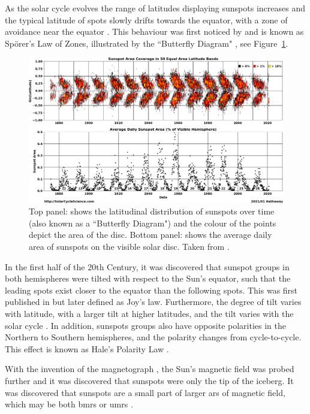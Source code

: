 As the solar cycle evolves the range of latitudes displaying sunspots increases and the typical latitude of spots slowly drifts towards the equator, with a zone of avoidance near the equator \citep{hathaway_solar_2015}. This behaviour was first noticed by \citet{carrington_observations_1863} and is known as Sp\"{o}rer’s Law of Zones, illustrated by the ``Butterfly Diagram" \citep{maunder_spoerers_1903, maunder_note_1904}, see Figure~\ref{fig:butterfly}.

\begin{figure}[ht!]
	\centering
	\includegraphics[width=\columnwidth]{ButterflyDiagram.png}
	\caption{Top panel: shows the latitudinal distribution of sunspots over time (also known as a ``Butterfly Diagram") and the colour of the points depict the area of the disc. Bottom panel: shows the average daily area of sunspots on the visible solar disc. Taken from \citet{hathaway_solar_2017}.}
	\label{fig:butterfly}
\end{figure}

In the first half of the 20th Century, it was discovered that sunspot groups in both hemispheres were tilted with respect to the Sun's equator, such that the leading spots exist closer to the equator than the following spots. This was first published in \citet{hale_magnetic_1919} but later defined as Joy's law. Furthermore, the degree of tilt varies with latitude, with a larger tilt at higher latitudes, and the tilt varies with the solar cycle \citep{hathaway_solar_2015}. In addition, sunspots groups also have opposite polarities in the Northern to Southern hemispheres, and the polarity changes from cycle-to-cycle. This effect is known as Hale’s Polarity Law \citep{hale_law_1925}.

With the invention of the magnetograph \citep{babcock_solar_1953}, the Sun's magnetic field was probed further and it was discovered that sunspots were only the tip of the iceberg. It was discovered that sunspots are a small part of larger \glspl{ar} of magnetic field, which may be both \glspl{bmr} or \glspl{umr} \citep{babcock_suns_1955}.

